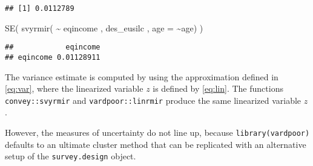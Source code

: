 \documentclass[
]{book}
\newenvironment{Shaded}{\begin{snugshade}}{\end{snugshade}}
\newcommand{\AttributeTok}[1]{\textcolor[rgb]{0.77,0.63,0.00}{#1}}
\newcommand{\CommentTok}[1]{\textcolor[rgb]{0.56,0.35,0.01}{\textit{#1}}}
\newcommand{\FunctionTok}[1]{\textcolor[rgb]{0.00,0.00,0.00}{#1}}
\newcommand{\NormalTok}[1]{#1}
\newcommand{\SpecialCharTok}[1]{\textcolor[rgb]{0.00,0.00,0.00}{#1}}
\begin{document}
\begin{Shaded}
\end{Shaded}

\begin{verbatim}
## [1] 0.0112789
\end{verbatim}

\begin{Shaded}
\begin{Highlighting}[]
\FunctionTok{SE}\NormalTok{( }\FunctionTok{svyrmir}\NormalTok{( }\SpecialCharTok{\textasciitilde{}}\NormalTok{ eqincome , des\_eusilc , }\AttributeTok{age =} \SpecialCharTok{\textasciitilde{}}\NormalTok{age) ) }
\end{Highlighting}
\end{Shaded}

\begin{verbatim}
##            eqincome
## eqincome 0.01128911
\end{verbatim}

The variance estimate is computed by using the approximation defined in \eqref{eq:var}, where the linearized variable \(z\) is defined by \eqref{eq:lin}. The functions \texttt{convey::svyrmir} and \texttt{vardpoor::linrmir} produce the same linearized variable \(z\).

However, the measures of uncertainty do not line up, because \texttt{library(vardpoor)} defaults to an ultimate cluster method that can be replicated with an alternative setup of the \texttt{survey.design} object.
\end{document}

